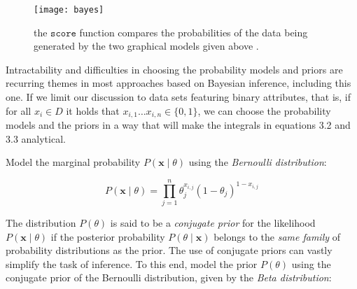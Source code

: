 \documentclass[12pt,twoside,notitlepage,amsart]{report} %
\begin{document}
	\begin{figure}%
	\texttt{[image: bayes]}
	
	\caption{the $\texttt{score}$ function compares the probabilities of the data being generated by the two graphical models given above \cite{Ghahramani06}. }%
	\end{figure} 
	
	
	
	
	
	Intractability and difficulties in choosing the probability models and priors are recurring themes in most approaches based on Bayesian inference, including this one. If we limit our discussion to data sets featuring binary attributes, that is, if for all $x_i \in D$ it holds that $x_{i,1} \ldots x_{i, n} \in \{0,1\}$, we can choose the probability models and the priors in a way that will make the integrals in equations 3.2 and 3.3 analytical. \clearpage
	
	Model the marginal probability $P(\mathbf{x} \mid \theta)$ using the \emph{Bernoulli distribution}:
	
	\begin{equation} \displaystyle P( \mathbf{x} \mid \theta) = \prod_{j=1}^{n}{ \theta_j^{x_{i,j}} (1 - \theta_j)^{1-x_{i,j}} } \end{equation}
	
	The distribution $P(\theta)$ is said to be a \emph{conjugate prior} for the likelihood $P(\mathbf{x}\mid\theta)$ if the posterior probability $P(\theta \mid \mathbf{x})$ belongs to the \emph{same family} of probability distributions as the prior. The use of conjugate priors can vastly simplify the task of inference. To this end, model the prior $P(\theta)$ using the conjugate prior of the Bernoulli distribution, given by the \emph{Beta distribution}: %
	
\end{document}
